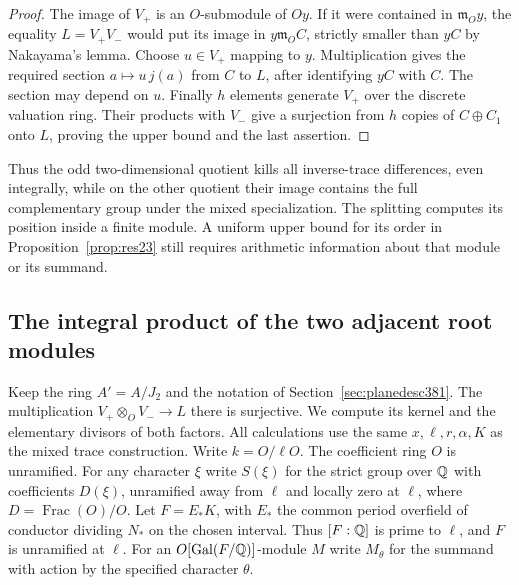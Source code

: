 \documentclass[a4paper,11pt]{article}
\theoremstyle{definition}
\theoremstyle{remark}
\numberwithin{equation}{section}
\begin{document}
\begin{proof}
The image of \(V_+\) is an \(O\)-submodule of \(Oy\).
If it were contained in \(\mathfrak m_Oy\), the equality
\(L=V_+V_-\) would put its image in
\(y\mathfrak m_O C\), strictly smaller than \(yC\) by
Nakayama's lemma. Choose \(u\in V_+\) mapping to \(y\).
Multiplication gives the required section
\(a\mapsto u\,j(a)\) from \(C\) to \(L\), after identifying
\(yC\) with \(C\). The section may depend on \(u\).
Finally \(h\) elements generate \(V_+\) over the discrete
valuation ring. Their products with \(V_-\) give a surjection
from \(h\) copies of \(C\oplus C_1\) onto \(L\), proving the
upper bound and the last assertion.
\end{proof}

Thus the odd two-dimensional quotient kills all inverse-trace
differences, even integrally, while on the other quotient their
image contains the full complementary group under the mixed
specialization. The splitting computes its position inside a
finite module. A uniform upper bound for its order in
Proposition~\ref{prop:res23} still requires arithmetic
information about that module or its summand.


\subsection{The integral product of the two adjacent root modules}
\label{sec:tensortrace382}

Keep the ring \(A'=A/J_2\) and the notation of
Section~\ref{sec:planedesc381}. The multiplication
\(V_+\otimes_O V_-\to L\) there is surjective. We compute
its kernel and the elementary divisors of both factors.
All calculations use the same \(x,\ell,r,\alpha,K\) as the
mixed trace construction. Write \(k=O/\ell O\). The coefficient
ring \(O\) is unramified. For any character \(\xi\) write
\(S(\xi)\) for the strict group over \(\mathbb Q\) with coefficients
\(D(\xi)\), unramified away from \(\ell\) and locally zero at
\(\ell\), where \(D=\operatorname{Frac}(O)/O\).
Let \(F=E_*K\), with \(E_*\) the common period overfield of
conductor dividing \(N_*\) on the chosen interval. Thus
\([F:\mathbb Q]\) is prime to \(\ell\), and \(F\) is unramified at
\(\ell\). For an \(O[\operatorname{Gal}(F/\mathbb Q)]\)-module \(M\)
write \(M_\theta\) for the summand with action by the
specified character \(\theta\).
\end{document}
